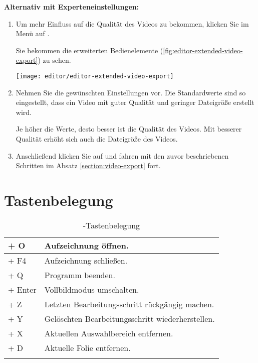 \textbf{Alternativ mit Experteneinstellungen:}

\begin{enumerate}
	\item Um mehr Einfluss auf die Qualität des Videos zu bekommen, klicken Sie im Menü auf .
	
	Sie bekommen die erweiterten Bedienelemente (\autoref{fig:editor-extended-video-export}) zu sehen.
	
	\begin{minipage}{0.9\textwidth}
		\centering
		\captionsetup{type=figure}
		\texttt{[image: editor/editor-extended-video-export]}
		\label{fig:editor-extended-video-export}
	\end{minipage}

	\item Nehmen Sie die gewünschten Einstellungen vor. Die Standardwerte sind so eingestellt, dass ein Video mit guter Qualität und geringer Dateigröße erstellt wird.
	
	\begin{info}
		Je höher die Werte, desto besser ist die Qualität des Videos. Mit besserer Qualität erhöht sich auch die Dateigröße des Videos.
	\end{info}

	\item Anschließend klicken Sie auf  und fahren mit den zuvor beschriebenen Schritten im Absatz \ref{section:video-export} fort.
\end{enumerate}

\vfill

\pagebreak
\section{Tastenbelegung}

\begin{longtable}{|p{}|l|}
	\hline
	{\ctrlKey} + O & Aufzeichnung öffnen.\\
	\hline
	{\ctrlKey} + F4 & Aufzeichnung schließen.\\
	\hline
	{\ctrlKey} + Q & Programm beenden.\\
	\hline
	{\altKey} + Enter & Vollbildmodus umschalten.\\
	\hline
	{\ctrlKey} + Z & Letzten Bearbeitungsschritt rückgängig machen.\\
	\hline
	{\ctrlKey} + Y & Gelöschten Bearbeitungsschritt wiederherstellen.\\
	\hline
	{\ctrlKey} + X & Aktuellen Auswahlbereich entfernen.\\
	\hline
	{\ctrlKey} + D & Aktuelle Folie entfernen.\\
	\hline
	\caption{\lectEditor{}-Tastenbelegung}
	\label{tab:editor-shortcuts}
\end{longtable}